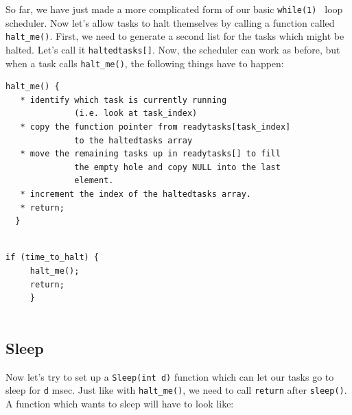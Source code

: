 So far, we have just made a more complicated form of our basic {\tt while(1) } loop scheduler.  Now let's allow tasks to halt themselves by calling a function called
{\tt halt\_me()}.   
First, we need to generate a second list for the tasks which might be halted.     Let's call it {\tt haltedtasks[]}.   Now, the scheduler can work as before, but when 
a task calls {\tt halt\_me()}, the following things have to happen:

\begin{verbatim}
halt_me() {
   * identify which task is currently running 
              (i.e. look at task_index)
   * copy the function pointer from readytasks[task_index] 
              to the haltedtasks array
   * move the remaining tasks up in readytasks[] to fill 
              the empty hole and copy NULL into the last 
              element.
   * increment the index of the haltedtasks array.
   * return;
  }
\end{verbatim}


%
%
\begin{verbatim}

if (time_to_halt) {
     halt_me();
     return;
     }
     
\end{verbatim}

%


\subsection*{Sleep}

  Now let's try to set up a {\tt Sleep(int d)} function which can let our tasks
go to sleep for {\tt d} msec.   Just like with {\tt halt\_me()},
we need to call {\tt return} after {\tt sleep()}. 
A function which wants to sleep will have to
look like:

